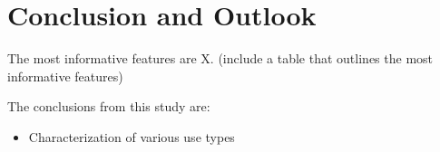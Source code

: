 \section{Conclusion and Outlook}
\label{sec:conclusion}

The most informative features are X. (include a table that outlines the most informative features)

The conclusions from this study are:

\begin{itemize}
\item Characterization of various use types 
\end{itemize}

